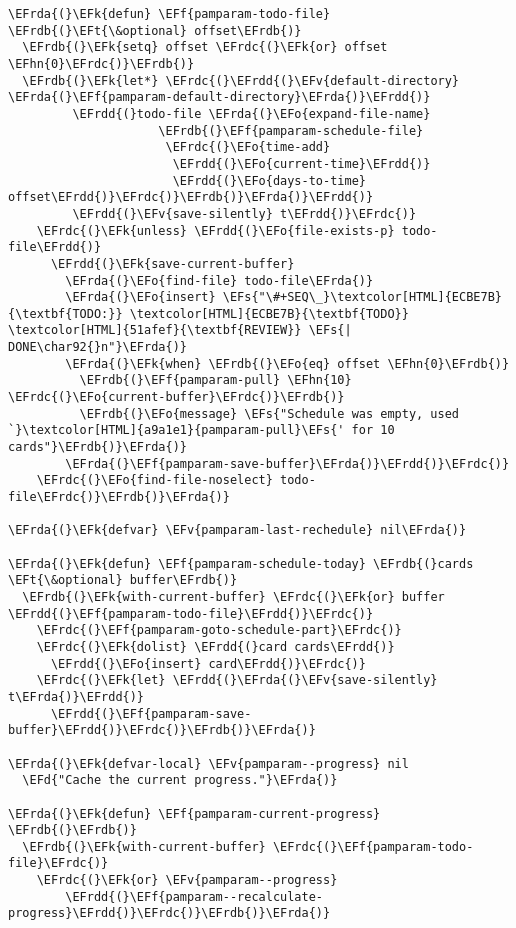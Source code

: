 \documentclass[a4wide,10pt]{article}
\newcommand{\EFs}[1]{\textcolor{EFs}{#1}} %
\newcommand{\EFd}[1]{\textcolor{EFd}{#1}} %
\newcommand{\EFk}[1]{\textcolor{EFk}{#1}} %
\newcommand{\EFf}[1]{\textcolor{EFf}{#1}} %
\newcommand{\EFv}[1]{\textcolor{EFv}{#1}} %
\newcommand{\EFt}[1]{\textcolor{EFt}{#1}} %
\newcommand{\EFo}[1]{\textcolor{EFo}{#1}} %
\newcommand{\EFhn}[1]{\textcolor{EFhn}{\textbf{#1}}} %
\newcommand{\EFrda}[1]{\textcolor{EFrda}{#1}} %
\newcommand{\EFrdb}[1]{\textcolor{EFrdb}{#1}} %
\newcommand{\EFrdc}[1]{\textcolor{EFrdc}{#1}} %
\newcommand{\EFrdd}[1]{\textcolor{EFrdd}{#1}} %
\begin{document}
\begin{Code}
\begin{Verbatim}
\EFrda{(}\EFk{defun} \EFf{pamparam-todo-file} \EFrdb{(}\EFt{\&optional} offset\EFrdb{)}
  \EFrdb{(}\EFk{setq} offset \EFrdc{(}\EFk{or} offset \EFhn{0}\EFrdc{)}\EFrdb{)}
  \EFrdb{(}\EFk{let*} \EFrdc{(}\EFrdd{(}\EFv{default-directory} \EFrda{(}\EFf{pamparam-default-directory}\EFrda{)}\EFrdd{)}
         \EFrdd{(}todo-file \EFrda{(}\EFo{expand-file-name}
                     \EFrdb{(}\EFf{pamparam-schedule-file}
                      \EFrdc{(}\EFo{time-add}
                       \EFrdd{(}\EFo{current-time}\EFrdd{)}
                       \EFrdd{(}\EFo{days-to-time} offset\EFrdd{)}\EFrdc{)}\EFrdb{)}\EFrda{)}\EFrdd{)}
         \EFrdd{(}\EFv{save-silently} t\EFrdd{)}\EFrdc{)}
    \EFrdc{(}\EFk{unless} \EFrdd{(}\EFo{file-exists-p} todo-file\EFrdd{)}
      \EFrdd{(}\EFk{save-current-buffer}
        \EFrda{(}\EFo{find-file} todo-file\EFrda{)}
        \EFrda{(}\EFo{insert} \EFs{"\#+SEQ\_}\textcolor[HTML]{ECBE7B}{\textbf{TODO:}} \textcolor[HTML]{ECBE7B}{\textbf{TODO}} \textcolor[HTML]{51afef}{\textbf{REVIEW}} \EFs{| DONE\char92{}n"}\EFrda{)}
        \EFrda{(}\EFk{when} \EFrdb{(}\EFo{eq} offset \EFhn{0}\EFrdb{)}
          \EFrdb{(}\EFf{pamparam-pull} \EFhn{10} \EFrdc{(}\EFo{current-buffer}\EFrdc{)}\EFrdb{)}
          \EFrdb{(}\EFo{message} \EFs{"Schedule was empty, used `}\textcolor[HTML]{a9a1e1}{pamparam-pull}\EFs{' for 10 cards"}\EFrdb{)}\EFrda{)}
        \EFrda{(}\EFf{pamparam-save-buffer}\EFrda{)}\EFrdd{)}\EFrdc{)}
    \EFrdc{(}\EFo{find-file-noselect} todo-file\EFrdc{)}\EFrdb{)}\EFrda{)}

\EFrda{(}\EFk{defvar} \EFv{pamparam-last-rechedule} nil\EFrda{)}

\EFrda{(}\EFk{defun} \EFf{pamparam-schedule-today} \EFrdb{(}cards \EFt{\&optional} buffer\EFrdb{)}
  \EFrdb{(}\EFk{with-current-buffer} \EFrdc{(}\EFk{or} buffer \EFrdd{(}\EFf{pamparam-todo-file}\EFrdd{)}\EFrdc{)}
    \EFrdc{(}\EFf{pamparam-goto-schedule-part}\EFrdc{)}
    \EFrdc{(}\EFk{dolist} \EFrdd{(}card cards\EFrdd{)}
      \EFrdd{(}\EFo{insert} card\EFrdd{)}\EFrdc{)}
    \EFrdc{(}\EFk{let} \EFrdd{(}\EFrda{(}\EFv{save-silently} t\EFrda{)}\EFrdd{)}
      \EFrdd{(}\EFf{pamparam-save-buffer}\EFrdd{)}\EFrdc{)}\EFrdb{)}\EFrda{)}

\EFrda{(}\EFk{defvar-local} \EFv{pamparam--progress} nil
  \EFd{"Cache the current progress."}\EFrda{)}

\EFrda{(}\EFk{defun} \EFf{pamparam-current-progress} \EFrdb{(}\EFrdb{)}
  \EFrdb{(}\EFk{with-current-buffer} \EFrdc{(}\EFf{pamparam-todo-file}\EFrdc{)}
    \EFrdc{(}\EFk{or} \EFv{pamparam--progress}
        \EFrdd{(}\EFf{pamparam--recalculate-progress}\EFrdd{)}\EFrdc{)}\EFrdb{)}\EFrda{)}


\end{Verbatim}
\end{Code}
\end{document}
